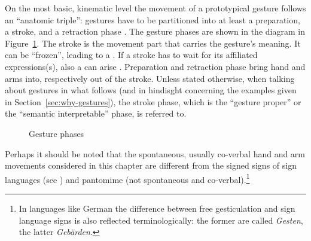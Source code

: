 \documentclass[output=paper]{langsci/langscibook}
\begin{document}
On the most basic, kinematic level the movement of a prototypical gesture follows an \enquote{anatomic triple}: gestures have to be partitioned into at least a preparation,  a stroke,   and a retraction  phase \citep{Kendon:1972}.
%
The gesture phases are shown in the diagram in Figure~\ref{fig:gesture-phases}.
%
The stroke is the movement part that carries the gesture's meaning. 
%
It can be \enquote{frozen}, leading to a . 
%
If a stroke has to wait for its affiliated expressions(s), also a  can arise \citep{Kita:vanGijn:vanDerHulst:1999}.
%
Preparation and retraction phase bring hand and arms into, respectively out of the stroke. 
%
Unless stated otherwise, when talking about gestures in what follows (and in hindisght concerning the examples given in Section~\ref{sec:why-gestures}), the stroke phase, which is the \enquote{gesture proper} or the \enquote{semantic interpretable} phase, is referred to.

\begin{figure}[tb]
  \centering
  \caption{Gesture phases}
  \label{fig:gesture-phases}
\end{figure}


Perhaps it should be noted that the spontaneous, usually co-verbal hand and arm movements considered in this chapter are different from the signed signs of sign languages  (see ) and pantomime  (not spontaneous and co-verbal).\footnote{In languages like German the difference between free gesticulation and sign language signs is also reflected terminologically: the former are called \textit{Gesten}, the latter \textit{Gebärden}.}
\end{document}
